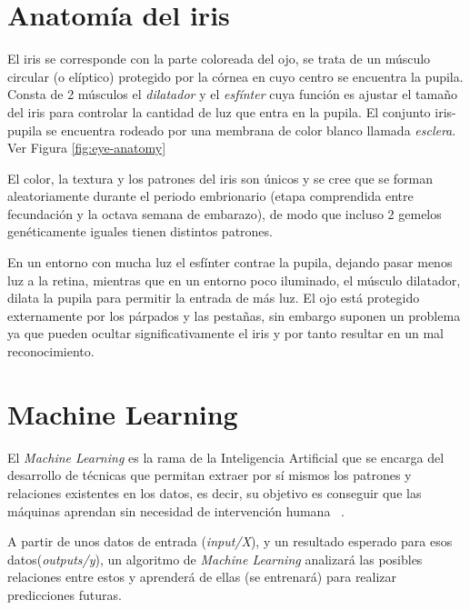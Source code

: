 
\section{Anatomía del iris}
El iris se corresponde con la parte coloreada del ojo, se trata de un músculo circular (o elíptico) protegido por la córnea en cuyo centro se encuentra la pupila. Consta de 2 músculos el \emph{dilatador} y el \emph{esfínter} cuya función es ajustar el tamaño del iris para controlar la cantidad de luz que entra en la pupila.
El conjunto iris-pupila se encuentra rodeado por una membrana de color blanco llamada \emph{esclera}. Ver Figura \ref{fig:eye-anatomy}

El color, la textura y los patrones del iris son únicos y se cree que se forman aleatoriamente durante el periodo embrionario (etapa comprendida entre fecundación y la octava semana de embarazo), de modo que incluso 2 gemelos genéticamente iguales tienen distintos patrones.

En un entorno con mucha luz el esfínter contrae la pupila, dejando pasar menos luz a la retina, mientras que en un entorno poco iluminado, el músculo dilatador, dilata la pupila para permitir la entrada de más luz.
El ojo está protegido externamente por los párpados y las pestañas, sin embargo suponen un problema ya que pueden ocultar significativamente el iris y por tanto resultar en un mal reconocimiento.
{}

\section{Machine Learning}
El \emph{Machine Learning} es la rama de la Inteligencia Artificial que se encarga del desarrollo de técnicas que permitan extraer por sí mismos los patrones y relaciones existentes en los datos, es decir, su objetivo es conseguir que las máquinas aprendan sin necesidad de intervención humana ~\cite{wiki:2020,valdez:2018}.

A partir de unos datos de entrada (\emph{input/X}), y un resultado esperado para esos datos(\emph{outputs/y}), un algoritmo de \emph{Machine Learning} analizará las posibles relaciones entre estos y aprenderá de ellas (se entrenará) para realizar predicciones futuras.
